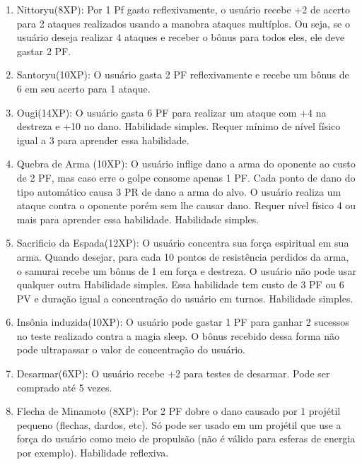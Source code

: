 \begin{enumerate}
	\item Nittoryu(8XP): Por 1 Pf gasto reflexivamente, o usuário recebe +2 de acerto para 2 ataques realizados usando a manobra ataques multíplos. Ou seja, se o usuário deseja realizar 4 ataques e receber o bônus para todos eles, ele deve gastar 2 PF.
	
	\item Santoryu(10XP): O usuário gasta 2 PF reflexivamente e recebe um bônus de 6 em seu acerto para 1 ataque. 
	
	\item Ougi(14XP): O usuário gasta 6 PF para realizar um ataque com +4 na destreza e +10 no dano. Habilidade simples. Requer mínimo de nível físico igual a 3 para aprender essa habilidade.


	\item Quebra de Arma (10XP): O usuário inflige dano a arma do oponente ao custo de 2 PF, mas caso erre o golpe consome apenas 1 PF. Cada ponto de dano do tipo automático causa 3 PR de dano a arma do alvo. O usuário realiza um ataque contra o oponente porém sem lhe causar dano. Requer nível físico 4 ou mais para aprender essa habilidade. Habilidade simples.

	\item Sacrificio da Espada(12XP): O usuário concentra sua força espiritual em sua arma. Quando desejar, para cada 10 pontos de resistência perdidos da arma, o samurai recebe um bônus de 1 em força e destreza. O usuário não pode usar qualquer outra Habilidade simples. Essa habilidade tem custo de 3 PF ou 6 PV e duração igual a concentração do usuário em turnos. Habilidade simples. 
	
	\item Insônia induzida(10XP): O usuário pode gastar 1 PF para ganhar 2 sucessos no teste realizado contra a magia sleep. O bônus recebido dessa forma não pode ultrapassar o valor de concentração do usuário.
		
 	\item Desarmar(6XP): O usuário recebe +2 para testes de desarmar. Pode ser comprado até 5 vezes.

	\item Flecha de Minamoto (8XP): Por 2 PF dobre o dano causado por 1 projétil pequeno (flechas, dardos, etc). Só pode ser usado em um projétil que use a força do usuário como meio de propulsão (não é válido para esferas de energia por exemplo). Habilidade reflexiva.	
	

\end{enumerate}
